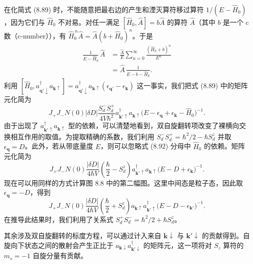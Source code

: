 在化简式 (8.89) 时，不能随意把最右边的产生和湮灭算符移过算符 $1/(E-\widehat{H}_{0})$，因为它们与 $\widehat{H}_{0}$ 不对易。对任一满足 $[\widehat{H}_{0}, \widehat{A}] = b\widehat{A}$ 的算符 $\widehat{A}$（其中 $b$ 是一个 c 数（c-number）），有 $\widehat{H}_{0}^{\,n}\widehat{A} = \widehat{A}(b + \widehat{H}_{0})^{n}$。于是
\begin{align*}
\frac{1}{E-\widehat{H}_{0}}\,\widehat{A} &= \frac{\widehat{A}}{E} \sum_{n=0}^{\infty} \frac{(\widehat{H}_{0}+b)^{n}}{E^{n}} \tag{8.90}\\
&= \widehat{A}\,\frac{1}{E-b-\widehat{H}_{0}}. \tag{8.91}
\end{align*}
利用 $[\widehat{H}_{0}, a_{\mathbf{q}'\downarrow}^{\dagger} a_{\mathbf{k}\uparrow}] = a_{\mathbf{q}'\downarrow}^{\dagger} a_{\mathbf{k}\uparrow} (\epsilon_{\mathbf{q}'} - \epsilon_{\mathbf{k}})$ 这一事实，我们把式 (8.89) 中的矩阵元化简为
\begin{equation*}
J_{+}J_{-} N(0)|\delta D| \frac{S_{d}^{-}S_{d}^{+}}{4V\hbar^{2}} a_{\mathbf{k}'\uparrow}^{\dagger} a_{\mathbf{k}\uparrow} \big( E - \epsilon_{\mathbf{q}} + \epsilon_{\mathbf{k}} - \widehat{H}_{0} \big)^{-1}.
\tag{8.92}
\end{equation*}
由于出现了 $a_{\mathbf{k}'\uparrow}^{\dagger} a_{\mathbf{k}\uparrow}$ 型的依赖，可以清楚地看到，双自旋翻转项改变了裸横向交换相互作用的取值。为提取精确的系数，我们利用 $S_{d}^{-}S_{d}^{+} = \hbar^{2}/2 - \hbar S_{d}^{z}$ 并取 $\epsilon_{\mathbf{q}} = D$。此外，若从带底量度 $E$，则可以忽略式 (8.92) 分母中 $\widehat{H}_{0}$ 的依赖。矩阵元化简为
\begin{equation*}
J_{+}J_{-} N(0) \frac{|\delta D|}{4\hbar V} \left( \frac{\hbar}{2} - S_{d}^{z} \right) a_{\mathbf{k}'\uparrow}^{\dagger} a_{\mathbf{k}\uparrow} \big( E - D + \epsilon_{\mathbf{k}} \big)^{-1}.
\tag{8.93}
\end{equation*}
现在可以用同样的方式计算图 8.8 中的第二幅图。这里中间态是粒子态，因此取 $\epsilon_{\mathbf{q}} = -D$，得到
\begin{equation*}
J_{+}J_{-} N(0) \frac{|\delta D|}{4\hbar V} \left( \frac{\hbar}{2} + S_{d}^{z} \right) a_{\mathbf{k}\uparrow} a_{\mathbf{k}'\uparrow}^{\dagger} \big( E - D - \epsilon_{\mathbf{k}'} \big)^{-1}.
\tag{8.94}
\end{equation*}
在推导此结果时，我们利用了关系式 $S_{d}^{+}S_{d}^{-} = \hbar^{2}/2 + \hbar S_{d}^{z}$。

其余涉及双自旋翻转的标度方程，可以通过计入来自 $\mathbf{k}\downarrow$ 与 $\mathbf{k}'\downarrow$ 的贡献得到。自旋向下状态之间的散射会产生正比于 $a_{\mathbf{k}\downarrow} a_{\mathbf{k}'\downarrow}^{\dagger}$ 的矩阵元，这一项将对 $S_{z}$ 算符的 $m_{s} = -1$ 自旋分量有贡献。

